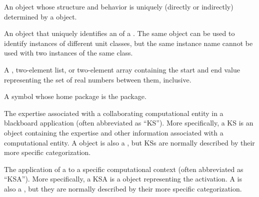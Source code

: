 \begin{glossary-list}
\glent[instance]
%
%
%
An object whose structure and behavior is uniquely (directly or indirectly)
determined by a  object.


%
%
%
%
An object that uniquely identifies an  of a
.  The same object can be used to identify instances of
different unit classes, but the same instance name cannot be used with two
instances of the same class.


\glent[interval] 
%
%
%
A , two-element list, or two-element array containing the start
and end value representing the set of real numbers between them, inclusive.


%
%
%
%
%
A symbol whose home package is the  package.


%
%
%
%
%
The expertise associated with a collaborating computational entity in
a blackboard application (often abbreviated as ``KS''). More
specifically, a KS is an object containing the expertise and other
information associated with a computational entity. A  object
is also a , but KSs are normally described
by their more specific categorization.


\glent[KS~activation]
%
%
%
%
%
%
%
%
%
The application of a  to a specific computational context
(often abbreviated as ``KSA'').  More specifically, a KSA is a
 object representing the  activation.  A
 is also a , but they are normally
described by their more specific categorization.


\end{glossary-list}
